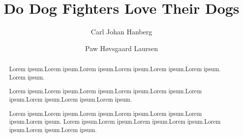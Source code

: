 \documentclass[preprint,12pt, authoryear]{elsarticle}
\begin{document}
\begin{frontmatter}


\title{Do Dog Fighters Love Their Dogs}




\author{Carl Johan Hanberg}
\author{Paw H\o vsgaard Laursen}


\begin{abstract}
Lorem ipsum.Lorem ipsum.Lorem ipsum.Lorem ipsum.Lorem ipsum.Lorem ipsum. Lorem ipsum.

Lorem ipsum.Lorem ipsum.Lorem ipsum.Lorem ipsum.Lorem ipsum.Lorem ipsum.Lorem ipsum.Lorem ipsum.Lorem ipsum.

Lorem ipsum.Lorem ipsum.Lorem ipsum.Lorem ipsum.Lorem ipsum.Lorem ipsum.Lorem ipsum.
Lorem ipsum.Lorem ipsum.Lorem ipsum.Lorem ipsum.Lorem ipsum.Lorem ipsum.Lorem ipsum.

\end{abstract}




\end{frontmatter}

\end{document}
